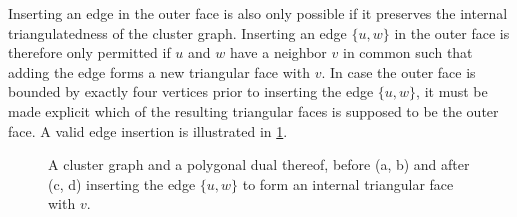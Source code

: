 Inserting an edge in the outer face is also only possible if it preserves the internal triangulatedness of the cluster graph. Inserting an edge $\{u,w\}$ in the outer face is therefore only permitted if $u$ and $w$ have a neighbor $v$ in common such that adding the edge forms a new triangular face with $v$. In case the outer face is bounded by exactly four vertices prior to inserting the edge $\{u,w\}$, it must be made explicit which of the resulting triangular faces is supposed to be the outer face. A valid edge insertion is illustrated in \cref{fig:flip-edge-example-insert}.

\begin{figure}[H]
	\centering
	\quad
	\qquad
	\quad
	\caption{A cluster graph and a polygonal dual thereof, before (a, b) and after (c, d) inserting the edge $\{u,w\}$ to form an internal triangular face with $v$.}
	\label{fig:flip-edge-example-insert}
\end{figure}

